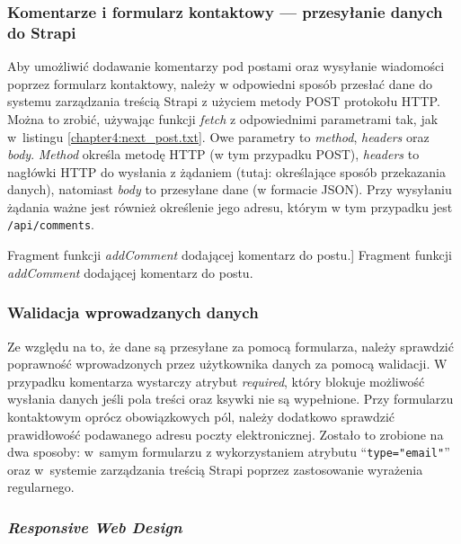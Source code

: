 \documentclass[a4paper, 12pt]{article}
\numberwithin{figure}{section}
\begin{document}
\begin{sloppypar}
\subsubsection*{Komentarze i formularz kontaktowy --- przesyłanie danych do Strapi}

Aby umożliwić dodawanie komentarzy pod postami oraz wysyłanie wiadomości poprzez formularz kontaktowy, należy w odpowiedni sposób przesłać dane do systemu zarządzania treścią Strapi z użyciem metody POST protokołu HTTP. Można to zrobić, używając funkcji \textit{fetch} z odpowiednimi parametrami tak, jak w~listingu \ref{chapter4:next_post.txt}. Owe parametry to \textit{method}, \textit{headers} oraz \textit{body}. \textit{Method} określa metodę HTTP (w tym przypadku POST), \textit{headers} to nagłówki HTTP do wysłania z żądaniem (tutaj: określające sposób przekazania danych), natomiast \textit{body} to przesyłane dane (w formacie JSON). Przy wysyłaniu żądania ważne jest również określenie jego adresu, którym w tym przypadku jest \texttt{/api/comments}. 

\begin{code}[htbp]
    
    \caption
    [Fragment funkcji \textit{addComment} dodającej komentarz do postu.]
    {Fragment funkcji \textit{addComment} dodającej komentarz do postu.}
    \label{chapter4:next_post.txt}
\end{code}

\subsubsection*{Walidacja wprowadzanych danych}

Ze względu na to, że dane są przesyłane za pomocą formularza, należy sprawdzić poprawność wprowadzonych przez użytkownika danych za pomocą walidacji. W przypadku komentarza wystarczy atrybut \textit{required}, który blokuje możliwość wysłania danych jeśli pola treści oraz ksywki nie są wypełnione. Przy formularzu kontaktowym oprócz obowiązkowych pól, należy dodatkowo sprawdzić prawidłowość podawanego adresu poczty elektronicznej. Zostało to zrobione na dwa sposoby: w~samym formularzu z wykorzystaniem atrybutu ``\texttt{type="email"}'' oraz w~systemie zarządzania treścią Strapi poprzez zastosowanie wyrażenia regularnego.

\subsubsection*{\textit{Responsive Web Design}}


\end{sloppypar}
\end{document}
